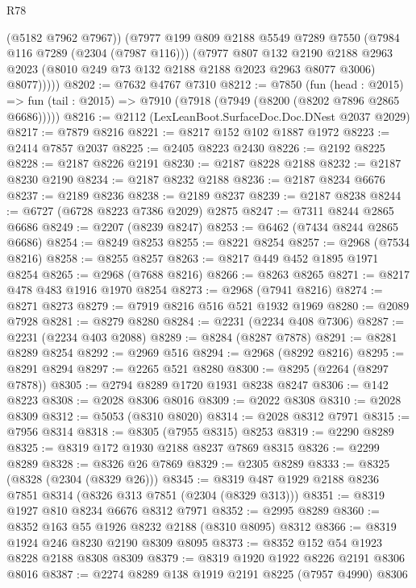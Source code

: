 \begin{lexlean}{R78}
\begin{coremodule}
            (@5182 @7962 @7967))
          (@7977
            @199
            @809
            @2188
            @5549
            @7289
            @7550
            (@7984 @116 @7289 (@2304 (@7987 @116)))
            (@7977
              @807
              @132
              @2190
              @2188
              @2963
              @2023
              (@8010 @249 @73 @132 @2188 @2188 @2023 @2963 @8077 @3006)
              @8077)))))
@8202 := @7632 @4767 @7310
@8212 := @7850
    (fun (head : @2015) =>
    fun (tail : @2015) => @7910 (@7918 (@7949 (@8200 (@8202 @7896 @2865 @6686)))))
@8216 := @2112 (LexLeanBoot.SurfaceDoc.Doc.DNest @2037 @2029)
@8217 := @7879 @8216
@8221 := @8217 @152 @102 @1887 @1972
@8223 := @2414 @7857 @2037
@8225 := @2405 @8223 @2430
@8226 := @2192 @8225
@8228 := @2187 @8226 @2191
@8230 := @2187 @8228 @2188
@8232 := @2187 @8230 @2190
@8234 := @2187 @8232 @2188
@8236 := @2187 @8234 @6676
@8237 := @2189 @8236
@8238 := @2189 @8237
@8239 := @2187 @8238
@8244 := @6727 (@6728 @8223 @7386 @2029) @2875
@8247 := @7311 @8244 @2865 @6686
@8249 := @2207 (@8239 @8247)
@8253 := @6462 (@7434 @8244 @2865 @6686)
@8254 := @8249 @8253
@8255 := @8221 @8254
@8257 := @2968 (@7534 @8216)
@8258 := @8255 @8257
@8263 := @8217 @449 @452 @1895 @1971 @8254
@8265 := @2968 (@7688 @8216)
@8266 := @8263 @8265
@8271 := @8217 @478 @483 @1916 @1970 @8254
@8273 := @2968 (@7941 @8216)
@8274 := @8271 @8273
@8279 := @7919 @8216 @516 @521 @1932 @1969
@8280 := @2089 @7928
@8281 := @8279 @8280
@8284 := @2231 (@2234 @408 @7306)
@8287 := @2231 (@2234 @403 @2088)
@8289 := @8284 (@8287 @7878)
@8291 := @8281 @8289 @8254
@8292 := @2969 @516
@8294 := @2968 (@8292 @8216)
@8295 := @8291 @8294
@8297 := @2265 @521 @8280
@8300 := @8295 (@2264 (@8297 @7878))
@8305 := @2794 @8289 @1720 @1931 @8238 @8247
@8306 := @142 @8223
@8308 := @2028 @8306 @8016
@8309 := @2022 @8308
@8310 := @2028 @8309
@8312 := @5053 (@8310 @8020)
@8314 := @2028 @8312 @7971
@8315 := @7956 @8314
@8318 := @8305 (@7955 @8315) @8253
@8319 := @2290 @8289
@8325 := @8319 @172 @1930 @2188 @8237 @7869 @8315
@8326 := @2299 @8289
@8328 := @8326 @26 @7869
@8329 := @2305 @8289
@8333 := @8325 (@8328 (@2304 (@8329 @26)))
@8345 := @8319 @487 @1929 @2188 @8236 @7851 @8314 (@8326 @313 @7851 (@2304 (@8329 @313)))
@8351 := @8319 @1927 @810 @8234 @6676 @8312 @7971
@8352 := @2995 @8289
@8360 := @8352 @163 @55 @1926 @8232 @2188 (@8310 @8095) @8312
@8366 := @8319 @1924 @246 @8230 @2190 @8309 @8095
@8373 := @8352 @152 @54 @1923 @8228 @2188 @8308 @8309
@8379 := @8319 @1920 @1922 @8226 @2191 @8306 @8016
@8387 := @2274 @8289 @138 @1919 @2191 @8225 (@7957 @4990) @8306

\end{coremodule}
\end{lexlean}
